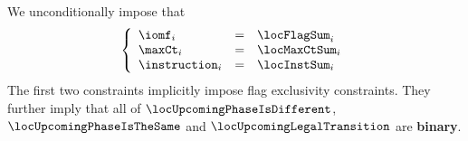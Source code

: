 We unconditionally impose that
\[
	\left\{ \begin{array}{lcl}
		\iomf        _{i} & = & \locFlagSum  _{i}                         \\
		\maxCt       _{i} & = & \locMaxCtSum _{i}                         \\
		\instruction _{i} & = & \locInstSum  _{i}                         \\
	\end{array} \right.
\]
\saNote{}
The first two constraints implicitly impose flag exclusivity constraints.
They further imply that all of
$\locUpcomingPhaseIsDifferent$,
$\locUpcomingPhaseIsTheSame$ and
$\locUpcomingLegalTransition$
are \textbf{binary}.
